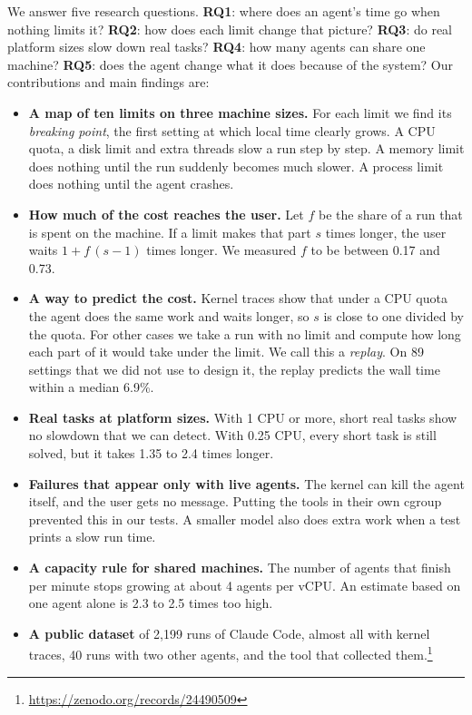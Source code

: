 \documentclass[sigconf,review,anonymous]{acmart}
\begin{document}
We answer five research questions. \textbf{RQ1}: where does an agent's
time go when nothing limits it? \textbf{RQ2}: how does each limit change
that picture? \textbf{RQ3}: do real platform sizes slow down real tasks?
\textbf{RQ4}: how many agents can share one machine? \textbf{RQ5}: does
the agent change what it does because of the system? Our contributions
and main findings are:
\begin{itemize}
\item \textbf{A map of ten limits on three machine sizes.} For each
  limit we find its \emph{breaking point}, the first setting at which
  local time clearly grows. A CPU quota, a disk limit and extra threads
  slow a run step by step. A memory limit does nothing until the run
  suddenly becomes much slower. A process limit does nothing until the
  agent crashes.
\item \textbf{How much of the cost reaches the user.} Let $f$ be the
  share of a run that is spent on the machine. If a limit makes that
  part $s$ times longer, the user waits $1 + f\,(s-1)$ times longer. We
  measured $f$ to be between 0.17 and 0.73.
\item \textbf{A way to predict the cost.} Kernel traces show that under
  a CPU quota the agent does the same work and waits longer, so $s$ is
  close to one divided by the quota. For other cases we take a run with
  no limit and compute how long each part of it would take under the
  limit. We call this a \emph{replay}. On 89 settings that we did not
  use to design it, the replay predicts the wall time within a median
  6.9\%.
\item \textbf{Real tasks at platform sizes.} With 1 CPU or more, short
  real tasks show no slowdown that we can detect. With 0.25 CPU, every
  short task is still solved, but it takes 1.35 to 2.4 times longer.
\item \textbf{Failures that appear only with live agents.} The kernel
  can kill the agent itself, and the user gets no message. Putting the
  tools in their own cgroup prevented this in our tests. A smaller model
  also does extra work when a test prints a slow run time.
\item \textbf{A capacity rule for shared machines.} The number of agents
  that finish per minute stops growing at about 4 agents per vCPU. An
  estimate based on one agent alone is 2.3 to 2.5 times too high.
\item \textbf{A public dataset} of 2,199 runs of Claude Code, almost all
  with kernel traces, 40 runs with two other agents, and the tool that
  collected them.\footnote{\url{https://zenodo.org/records/24490509}}
\end{itemize}
\end{document}
